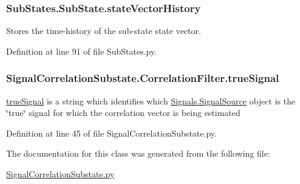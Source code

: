 \subsubsection[{\texorpdfstring{state\+Vector\+History}{stateVectorHistory}}]{\setlength{\rightskip}{0pt plus 5cm}Sub\+States.\+Sub\+State.\+state\+Vector\+History\hspace{0.3cm}{\ttfamily [inherited]}}\hypertarget{classSubStates_1_1SubState_a24bf2de56fc3037d91cba43d28f3bf60}{}\label{classSubStates_1_1SubState_a24bf2de56fc3037d91cba43d28f3bf60}


Stores the time-\/history of the sub-\/state state vector. 



Definition at line 91 of file Sub\+States.\+py.

\subsubsection[{\texorpdfstring{true\+Signal}{trueSignal}}]{\setlength{\rightskip}{0pt plus 5cm}Signal\+Correlation\+Substate.\+Correlation\+Filter.\+true\+Signal}\hypertarget{classSignalCorrelationSubstate_1_1CorrelationFilter_a67ff75effd8a8a7e34f0f3e8c56ef491}{}\label{classSignalCorrelationSubstate_1_1CorrelationFilter_a67ff75effd8a8a7e34f0f3e8c56ef491}


\hyperlink{classSignalCorrelationSubstate_1_1CorrelationFilter_a67ff75effd8a8a7e34f0f3e8c56ef491}{true\+Signal} is a string which identifies which \hyperlink{classSignals_1_1SignalSource}{Signals.\+Signal\+Source} object is the \char`\"{}true\char`\"{} signal for which the correlation vector is being estimated 



Definition at line 45 of file Signal\+Correlation\+Substate.\+py.



The documentation for this class was generated from the following file\+:\begin{DoxyCompactItemize}
\item 
\hyperlink{SignalCorrelationSubstate_8py}{Signal\+Correlation\+Substate.\+py}\end{DoxyCompactItemize}

